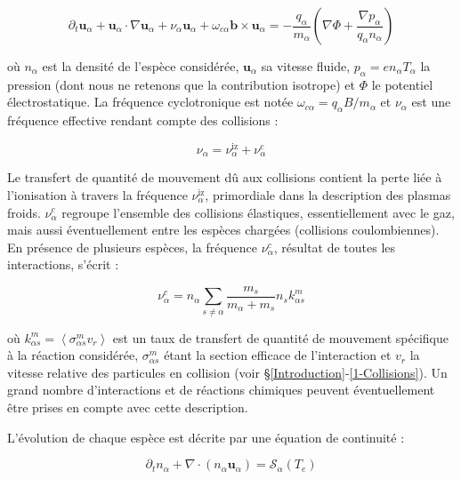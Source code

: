 \begin{refsection}
\begin{equation}
\label{3-eqMouvement}
\partial_t \mathbf{u}_\alpha + \mathbf{u}_\alpha\cdot\nabla\mathbf{u}_\alpha+
\nu_\alpha\mathbf{u}_\alpha+\omega_{c\alpha}\mathbf{b}\times\mathbf{u}_\alpha=
-\frac{q_\alpha}{m_\alpha}\left(\nabla \Phi+\frac{\nabla
p_\alpha}{q_\alpha n_\alpha}\right)
\end{equation}

où $n_\alpha$ est la densité de l'espèce considérée, $\mathbf{u}_\alpha$ sa
vitesse fluide, $p_\alpha =en_\alpha T_\alpha$ la pression (dont nous ne
retenons que la contribution isotrope) et $\Phi$ le potentiel électrostatique. La fréquence
cyclotronique est notée $\omega_{c\alpha}=q_\alpha B/m_\alpha$ et $\nu_\alpha$
est une fréquence effective rendant compte des collisions :

\begin{equation}
\nu_\alpha=\nu_{\alpha}^\text{iz}+\nu_{\alpha}^{c}
\end{equation}

Le transfert de quantité de mouvement dû aux collisions contient la perte liée à
l'ionisation à travers la fréquence $\nu_{\alpha}^\text{iz}$, primordiale dans
la description des plasmas froids. $\nu_{\alpha}^{c}$ regroupe l'ensemble des
collisions élastiques, essentiellement avec le gaz, mais aussi éventuellement
entre les espèces chargées (collisions coulombiennes). En présence de plusieurs espèces, la
fréquence $\nu_{\alpha}^{c}$, résultat de toutes les interactions, s'écrit :

\begin{equation}
\nu_{\alpha}^c=n_\alpha\sum_{s\neq\alpha} \frac{m_s}{m_\alpha+m_s}
n_sk^m_{\alpha s}
\end{equation}

où $k^m_{\alpha
s}=\left<\sigma^m_{\alpha s}v_r\right>$ est un taux de transfert de quantité de
mouvement spécifique à la réaction considérée, $\sigma^m_{\alpha s}$ étant la
section efficace de l'interaction et $v_r$ la vitesse relative des particules en
collision (voir \S\ref{Introduction}-\ref{1-Collisions}). Un grand nombre
d'interactions et de réactions chimiques peuvent éventuellement être prises en compte avec cette description.

L'évolution de chaque espèce est décrite par une équation de continuité :

\begin{equation}
\label{3-continuite}
\partial_t n_\alpha +
\nabla\cdot\left(n_\alpha\mathbf{u}_\alpha\right)=\mathcal{S}_\alpha(T_e)
\end{equation}


\end{refsection}

